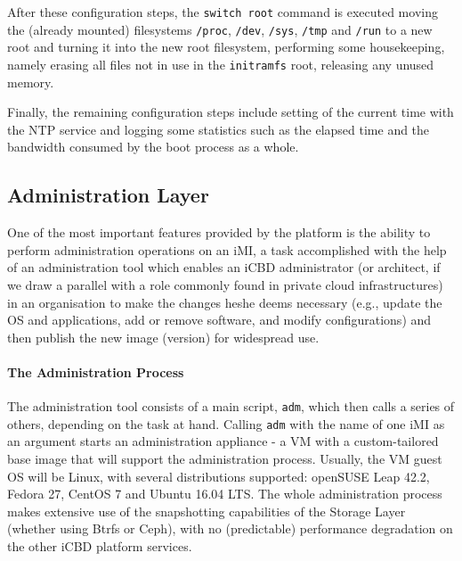 After these configuration steps, the \texttt{switch root} command is executed moving the (already mounted) filesystems \texttt{/proc}, \texttt{/dev}, \texttt{/sys}, \texttt{/tmp} and \texttt{/run} to a new root and turning it into the new root filesystem, performing some housekeeping, namely erasing all files not in use in the \texttt{initramfs} root, releasing any unused memory.

Finally, the remaining configuration steps include setting of the current time with the NTP service and logging some statistics such as the elapsed time and the bandwidth consumed by the boot process as a whole.



\subsection{Administration Layer}
\label{sub:icbd_adm_layer}

One of the most important features provided by the platform is the ability to perform administration operations on an iMI, a task accomplished with the help of an administration tool which enables an iCBD administrator (or architect, if we draw a parallel with a role commonly found in private cloud infrastructures) in an organisation to make the changes he\/she deems necessary (e.g., update the OS and applications, add or remove software, and modify configurations) and then publish the new image (version) for widespread use.




\paragraph{The Administration Process}
\label{par:admin_imi}

The administration tool consists of a main script, \texttt{adm}, which then calls a series of others, depending on the task at hand. Calling \texttt{adm} with the name of one iMI as an argument starts an administration appliance - a VM with a custom-tailored base image that will support the administration process. Usually, the VM guest OS will be Linux, with several distributions supported: openSUSE Leap 42.2, Fedora 27, CentOS 7 and Ubuntu 16.04 LTS. The whole administration process makes extensive use of the snapshotting capabilities of the Storage Layer (whether using Btrfs or Ceph), with no (predictable) performance degradation on the other iCBD platform services.

